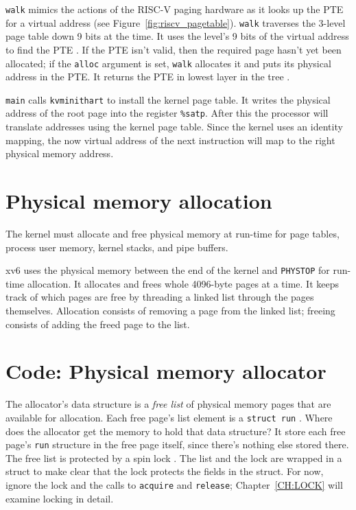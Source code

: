 \lstinline{walk}
mimics the actions of the RISC-V paging hardware as it
looks up the PTE for a virtual address (see
Figure~\ref{fig:riscv_pagetable}).
\lstinline{walk}
traverses the 3-level page table down 9 bits at the time.
It uses the level's 9 bits of the virtual address to find
the PTE
.
If the PTE isn't valid, then
the required page hasn't yet been allocated;
if the
\lstinline{alloc}
argument is set,
\lstinline{walk}
allocates it and puts its physical address in the PTE.
It returns the PTE in lowest layer in the tree
.

\lstinline{main}
calls
\lstinline{kvminithart}
to install the kernel page table.
It writes the physical address of the root page
into the register
\texttt{\%satp}.
After this the processor will translate addresses using the kernel
page table.  Since the kernel uses an identity mapping, the now
virtual address of the next instruction will map to the right physical
memory address.
\section{Physical memory allocation}

The kernel must allocate and free physical memory at run-time for
page tables,
process user memory,
kernel stacks,
and pipe buffers.

xv6 uses the physical memory between the end of the kernel and
\lstinline{PHYSTOP}
for run-time allocation. It allocates and frees whole 4096-byte pages
at a time. It keeps track of which pages are free by threading a
linked list through the pages themselves. Allocation consists of
removing a page from the linked list; freeing consists of adding the
freed page to the list.
\section{Code: Physical memory allocator}

The allocator's data structure is a
\textit{free list}
of physical memory pages that are available
for allocation.
Each free page's list element is a
\lstinline{struct run}
.
Where does the allocator get the memory
to hold that data structure?
It store each free page's
\lstinline{run}
structure in the free page itself,
since there's nothing else stored there.
The free list is
protected by a spin lock
.
The list and the lock are wrapped in a struct
to make clear that the lock protects the fields
in the struct.
For now, ignore the lock and the calls to
\lstinline{acquire}
and
\lstinline{release};
Chapter~\ref{CH:LOCK} will examine
locking in detail.

